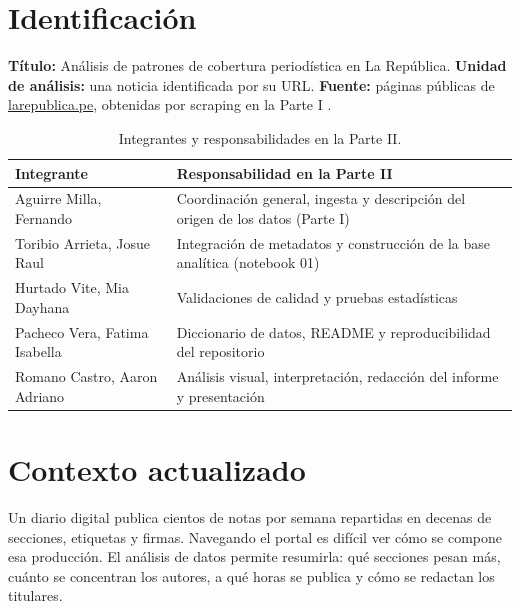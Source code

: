 \documentclass[12pt,a4paper]{article}
\begin{document}
\section{Identificación}
\textbf{Título:} Análisis de patrones de cobertura periodística en La República. \textbf{Unidad de análisis:} una noticia identificada por su URL. \textbf{Fuente:} páginas públicas de \href{https://larepublica.pe}{larepublica.pe}, obtenidas por scraping en la Parte I \cite{larepublica}.

\begin{table}[H]\centering
\caption{Integrantes y responsabilidades en la Parte II.}
\begin{tabular}{p{5.2cm}p{9.6cm}}
\toprule
\textbf{Integrante} & \textbf{Responsabilidad en la Parte II}\\\midrule
Aguirre Milla, Fernando & Coordinación general, ingesta y descripción del origen de los datos (Parte I)\\
Toribio Arrieta, Josue Raul & Integración de metadatos y construcción de la base analítica (notebook 01)\\
Hurtado Vite, Mia Dayhana & Validaciones de calidad y pruebas estadísticas\\
Pacheco Vera, Fatima Isabella & Diccionario de datos, README y reproducibilidad del repositorio\\
Romano Castro, Aaron Adriano & Análisis visual, interpretación, redacción del informe y presentación\\
\bottomrule
\end{tabular}
\end{table}

\section{Contexto actualizado}
Un diario digital publica cientos de notas por semana repartidas en decenas de secciones, etiquetas y firmas. Navegando el portal es difícil ver cómo se compone esa producción. El análisis de datos permite resumirla: qué secciones pesan más, cuánto se concentran los autores, a qué horas se publica y cómo se redactan los titulares.
\end{document}
